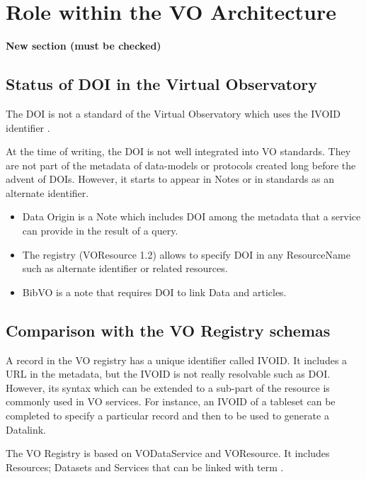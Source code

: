 \documentclass[11pt,a4paper]{ivoa}
\begin{document}
\section{Role within the VO Architecture}
\textbf{\color{red}New section (must be checked)}

\subsection{Status of DOI in the Virtual Observatory}
The DOI is not a standard of the Virtual Observatory which uses the IVOID identifier \citep{note:ivoid}.

At the time of writing, the DOI is not well integrated into VO standards. They are not part of the metadata of data-models or protocols created long before the advent of DOIs.
However, it starts to appear in Notes or in standards as an alternate identifier.


\begin {itemize}
\item Data Origin \citep{note:dataorigin} is a Note which includes DOI among the metadata that a service can provide in the result of a query.
\item The registry \citep{std:registry} (VOResource 1.2) allows to specify DOI in any ResourceName such as alternate identifier or related resources.
\item BibVO \citep{note:bibvo} is a note that requires DOI to link Data and articles.
\end{itemize}


\subsection{Comparison with the VO Registry schemas}
 A record in the VO registry has a unique identifier called IVOID. It includes a URL in the metadata, but the IVOID is not really resolvable such as DOI. However, its syntax which can be extended to a sub-part of the resource is commonly used in VO services. For instance, an IVOID of a tableset can be completed to specify a particular record and then to be used to generate a Datalink.
 
 The VO Registry is  based on VODataService and VOResource. It includes Resources; Datasets and Services that can be linked with term . 
 
\end{document}

